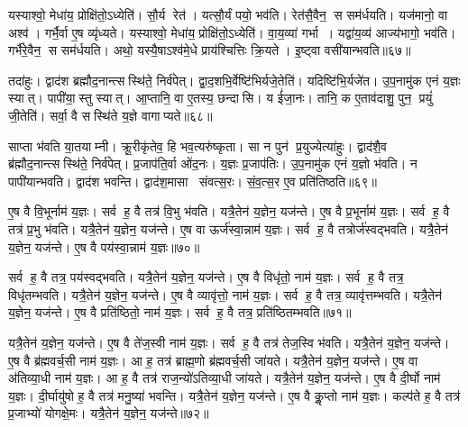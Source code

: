 यस्याश्वो॒ मेधा॑य॒ प्रोक्षि॑तो॒ऽध्येति॑।
सौ॒र्य रेत॑।
यत्सौ॒र्यं पयो॒ भव॑ति।
रेत॑सै॒वैन॒ स सम॑र्धयति।
यज॑मानो॒ वा अश्व॑।
गर्भै॒र्वा ए॒ष व्यृ॑ध्यते।
यस्याश्वो॒ मेधा॑य॒ प्रोक्षि॑तो॒ऽध्येति॑।
वा॒य॒व्या॑ गर्भा।
यद्वा॑य॒व्य॑ आज्य॑भागो॒ भव॑ति।
गर्भै॑रे॒वैन॒ स सम॑र्धयति।
अथो॒ यस्यै॒षाऽश्व॑मे॒धे प्राय॑श्चित्तिः क्रि॒यते।
इ॒ष्ट्वा वसी॑यान्भवति॥६७॥\anuvakamend[वि॒न्दत्यश्लो॑णो है॒व भ॑वत्यधी॒यादृ॑ध्यते॒ गर्भै॑रे॒वैन॒ स सम॑र्धयति॒ द्वे च॑]

तदा॑हुः।
द्वाद॑श ब्रह्मौद॒नान्त्सस्थि॑ते॒ निर्व॑पेत्।
द्वा॒द॒शभि॒र्वेष्टि॑भिर्यजे॒तेति॑।
यदिष्टि॑भि॒र्यजे॑त।
उ॒प॒नामु॑क एनं य॒ज्ञः स्यात्।
पापी॑या॒स्तु स्यात्।
आ॒प्तानि॒ वा ए॒तस्य॒ छन्दासि।
य ई॑जा॒नः।
तानि॒ क ए॒ताव॑दाशु॒ पुन॒ प्रयुं॑ जी॒तेति॑।
सर्वा॒ वै सस्थि॑ते य॒ज्ञे वागाप्यते॥६८॥

साप्ता भ॑वति या॒तयाम्नी।
क्रू॒रीकृ॑तेव॒ हि भव॒त्यरु॑ष्कृता।
सा न पुन॑ प्र॒युज्येत्या॑हुः।
द्वाद॑शै॒व ब्र॑ह्मौद॒नान्त्सस्थि॑ते॒ निर्व॑पेत्।
प्र॒जाप॑ति॒र्वा ओ॑द॒नः।
य॒ज्ञः प्र॒जाप॑तिः।
उ॒प॒नामु॑क एनं य॒ज्ञो भ॑वति।
न पापी॑यान्भवति।
द्वाद॑श भवन्ति।
द्वाद॑श॒मासा संवत्स॒रः।
सं॒व॒त्स॒र ए॒व प्रति॑तिष्ठति॥६९॥\anuvakamend[आ॒प्य॒ते॒ सं॒व॒त्स॒र एकं च]

ए॒ष वै वि॒भूर्नाम॑ य॒ज्ञः।
सर्व ह॒ वै तत्र॑ वि॒भु भ॑वति।
यत्रै॒तेन॑ य॒ज्ञेन॒ यज॑न्ते।
ए॒ष वै प्र॒भूर्नाम॑ य॒ज्ञः।
सर्व ह॒ वै तत्र॑ प्र॒भु भ॑वति।
यत्रै॒तेन॑ य॒ज्ञेन॒ यज॑न्ते।
ए॒ष वा ऊर्ज॑स्वा॒न्नाम॑ य॒ज्ञः।
सर्व ह॒ वै तत्रोर्ज॑स्वद्भवति।
यत्रै॒तेन॑ य॒ज्ञेन॒ यज॑न्ते।
ए॒ष वै पय॑स्वा॒न्नाम॑ य॒ज्ञः॥७०॥

सर्व ह॒ वै तत्र॒ पय॑स्वद्भवति।
यत्रै॒तेन॑ य॒ज्ञेन॒ यज॑न्ते।
ए॒ष वै विधृ॑तो॒ नाम॑ य॒ज्ञः।
सर्व ह॒ वै तत्र॒ विधृ॑तम्भवति।
यत्रै॒तेन॑ य॒ज्ञेन॒ यज॑न्ते।
ए॒ष वै व्यावृ॑त्तो॒ नाम॑ य॒ज्ञः।
सर्व ह॒ वै तत्र॒ व्यावृ॑त्तम्भवति।
यत्रै॒तेन॑ य॒ज्ञेन॒ यज॑न्ते।
ए॒ष वै प्रति॑ष्ठितो॒ नाम॑ य॒ज्ञः।
सर्व ह॒ वै तत्र॒ प्रति॑ष्ठितम्भवति॥७१॥

यत्रै॒तेन॑ य॒ज्ञेन॒ यज॑न्ते।
ए॒ष वै ते॑ज॒स्वी नाम॑ य॒ज्ञः।
सर्व ह॒ वै तत्र॑ तेज॒स्वि भ॑वति।
यत्रै॒तेन॑ य॒ज्ञेन॒ यज॑न्ते।
ए॒ष वै ब्र॑ह्मवर्च॒सी नाम॑ य॒ज्ञः।
आ ह॒ तत्र॑ ब्राह्म॒णो ब्र॑ह्मवर्च॒सी जा॑यते।
यत्रै॒तेन॑ य॒ज्ञेन॒ यज॑न्ते।
ए॒ष वा अ॑तिव्या॒धी नाम॑ य॒ज्ञः।
आ ह॒ वै तत्र॑ राज॒न्यो॑ऽतिव्या॒धी जा॑यते।
यत्रै॒तेन॑ य॒ज्ञेन॒ यज॑न्ते।
ए॒ष वै दी॒र्घो नाम॑ य॒ज्ञः।
दी॒र्घायु॑षो ह॒ वै तत्र॑ मनु॒ष्या॑ भवन्ति।
यत्रै॒तेन॑ य॒ज्ञेन॒ यज॑न्ते।
ए॒ष वै कॢ॒प्तो नाम॑ य॒ज्ञः।
कल्प॑ते ह॒ वै तत्र॑ प्र॒जाभ्यो॑ योगक्षे॒मः।
यत्रै॒तेन॑ य॒ज्ञेन॒ यज॑न्ते॥७२॥

